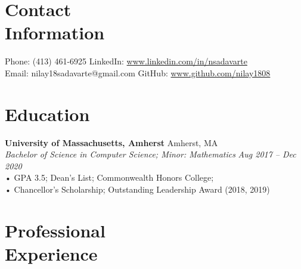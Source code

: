 \documentclass[margin,line]{resume}
\begin{document}
\begin{resume}
    \section{\mysidestyle Contact\\Information}

    Phone: (413) 461-6925       \hfill LinkedIn: \url{www.linkedin.com/in/nsadavarte} 
    \\
    \noindent Email: nilay18sadavarte@gmail.com  \hfill GitHub: \url{www.github.com/nilay1808}
    \\
    \vspace{-4.5mm}

    \section{\mysidestyle Education}

    \textbf{University of Massachusetts, Amherst} \hfill Amherst, MA
    \\
    \textsl{Bachelor of Science in Computer Science; Minor: Mathematics} \hfill \textsl{Aug 2017 -- Dec 2020} 
    \\
    • GPA 3.5; Dean’s List; Commonwealth Honors College;
    \\
    • Chancellor’s Scholarship; Outstanding Leadership Award (2018, 2019)

    \section{\mysidestyle Professional\\Experience}


\end{resume}
\end{document}
